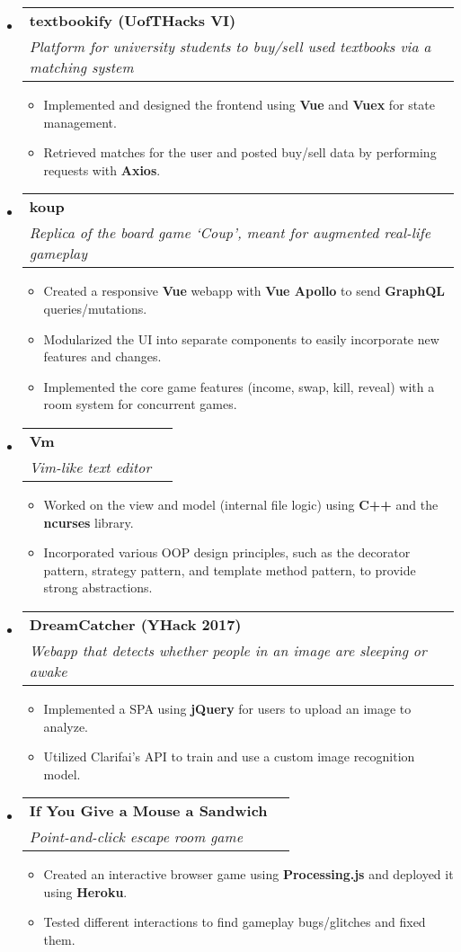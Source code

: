 \documentclass[letterpaper,11pt]{article}
\makeatletter
\newlength{\outerbordwidth}
\newcommand{\resitem}[1]{\item #1 \vspace{-2pt}}
\newcommand{\ressubheading}[4]{
\begin{tabular*}{6.5in}{l@{\cftdotfill{\cftsecdotsep}\extracolsep{\fill}}r}
		\textbf{#1} & #2 \\
		\textit{#3} & \textit{#4} \\
\end{tabular*}\vspace{-6pt}}
\newcommand{\resheadingrest}[1]{\vspace{0pt}
  \parbox{\textwidth}{\setlength{\FrameSep}{\outerbordwidth}
    \begin{shaded}
\setlength{\fboxsep}{0pt}\framebox[\textwidth][l]{\setlength{\fboxsep}{4pt}\fcolorbox{shadecolorB}{shadecolorB}{\textbf{\mbox{~}\makebox[6.762in][l]{\large #1} \vphantom{p\^{E}}}}} %
    \end{shaded}
  }\vspace{-5pt}
}
\newcommand{\resitemlast}[1]{\item #1 \vspace{-7pt}}
\makeatother
\begin{document}
\resheadingrest{Projects}
\begin{itemize}[topsep=0pt] %
\item
	\ressubheading
	{textbookify \textmd{(UofTHacks VI)}}{\href{https://github.com/stevenw47/textbookify}{\faicon{github}}}
	{Platform for university students to buy/sell used textbooks via a matching system}{}
	\begin{itemize}[itemsep=0pt]
		\resitem{Implemented and designed the frontend using \textbf{Vue} and \textbf{Vuex} for state management.}
		\resitem{Retrieved matches for the user and posted buy/sell data by performing requests with \textbf{Axios}.}
	\end{itemize}

\item
	\ressubheading
	{koup}{\href{https://github.com/stevenw47/koup}{\faicon{github}}}
	{Replica of the board game `Coup', meant for augmented real-life gameplay}{}
	\begin{itemize}[itemsep=0pt]
		\resitem{Created a responsive \textbf{Vue} webapp with \textbf{Vue Apollo} to send \textbf{GraphQL} queries/mutations.}
		\resitem{Modularized the UI into separate components to easily incorporate new features and changes.}
		\resitem{Implemented the core game features (income, swap, kill, reveal) with a room system for concurrent games.}
	\end{itemize}

\item
	\ressubheading
	{Vm}{}
	{Vim-like text editor}{}
	\begin{itemize}[itemsep=0pt]
		\resitem{Worked on the view and model (internal file logic) using \textbf{C++} and the \textbf{ncurses} library.}
		\resitem{Incorporated various OOP design principles, such as the decorator pattern, strategy pattern, and template method pattern, to provide strong abstractions.}
	\end{itemize}

\item
	\ressubheading
	{DreamCatcher \textmd{(YHack 2017)}}{\href{https://github.com/stevenw47/DreamCatcher}{\faicon{github}}}
	{Webapp that detects whether people in an image are sleeping or awake}{}
	\begin{itemize}[itemsep=0pt]
		\resitem{Implemented a SPA using \textbf{jQuery} for users to upload an image to analyze.}
		\resitem{Utilized Clarifai's API to train and use a custom image recognition model.}
	\end{itemize}

\item
	\ressubheading
	{If You Give a Mouse a Sandwich}{\href{https://github.com/stevenw47/If-You-Give-a-Mouse-a-Sandwich}{\faicon{github}}}
	{Point-and-click escape room game}{}
	\begin{itemize}[itemsep=0pt]
		\resitem{Created an interactive browser game using \textbf{Processing.js} and deployed it using \textbf{Heroku}.}
		\resitemlast{Tested different interactions to find gameplay bugs/glitches and fixed them.}
	\end{itemize}
\end{itemize}
\end{document}
